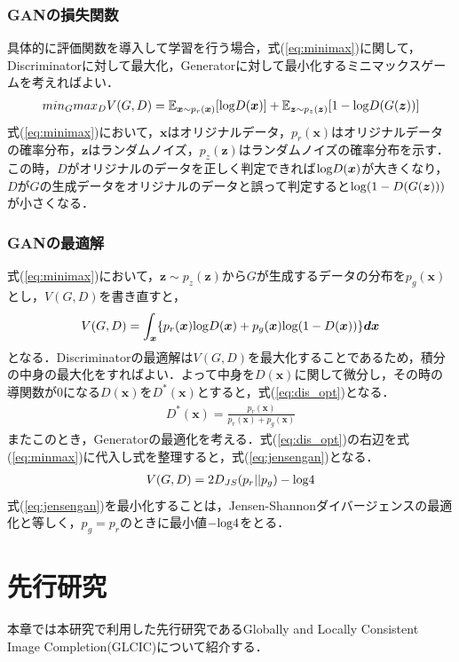 \documentclass[a4j, 11pt]{jreport}
\newcommand{\eref}[1]{式(\ref{#1})}
\begin{document}
\newpage
\subsection{GANの損失関数}
具体的に評価関数を導入して学習を行う場合，\eref{eq:minimax}に関して，Discriminatorに対して最大化，Generatorに対して最小化するミニマックスゲームを考えればよい\cite{GAN}．
\begin{eqnarray}
	min_G max_DV(G, D) = \mathbb E_{\bm x \sim p_r(\bm x)}[{\rm log}D(\bm x)] + \mathbb E_{\bm z \sim p_z(\bm z)}[1 - {\rm log}D(G(\bm z))] \label{eq:minimax}
\end{eqnarray}
\eref{eq:minimax}において，$\bm x$はオリジナルデータ，$p_r(\bm x)$はオリジナルデータの確率分布，$\bm z$はランダムノイズ，$p_z(\bm z)$はランダムノイズの確率分布を示す．
この時，$D$がオリジナルのデータを正しく判定できれば${\rm log}D(\bm x)$が大きくなり，$D$が$G$の生成データをオリジナルのデータと誤って判定すると${\rm log}(1-D(G(\bm z)))$が小さくなる．

\subsection{GANの最適解}
\eref{eq:minimax}において，$\bm z \sim p_z(\bm z)$から$G$が生成するデータの分布を$p_g(\bm x)$とし，$V(G, D)$を書き直すと，
\begin{eqnarray}
	V(G, D) = \int_{\bm x} \{p_r(\bm x) {\rm log}D(\bm x) + p_g(\bm x) {\rm log}(1-D(\bm x)) \} \bm{dx}\label{eq:minmax}
\end{eqnarray}
となる．Discriminatorの最適解は$V(G, D)$を最大化することであるため，積分の中身の最大化をすればよい．よって中身を$D(\bm x)$に関して微分し，その時の導関数が0になる$D(\bm x)$を$D^*(\bm x)$とすると，\eref{eq:dis_opt}となる．
\begin{eqnarray}
	D^*(\bm x) = \frac{p_r(\bm x)}{p_r(\bm x) + p_g(\bm x)}\label{eq:dis_opt}
\end{eqnarray}
またこのとき，Generatorの最適化を考える．\eref{eq:dis_opt}の右辺を\eref{eq:minmax}に代入し式を整理すると，\eref{eq:jensengan}となる．
\begin{eqnarray}
	V(G, D) = 2D_{JS}(p_r||p_g)-\rm log4 \label{eq:jensengan}
\end{eqnarray}
\eref{eq:jensengan}を最小化することは，Jensen-Shannonダイバージェンスの最適化と等しく，$p_g = p_r$のときに最小値$- \rm log4$をとる．

\chapter{先行研究}
本章では本研究で利用した先行研究であるGlobally and Locally Consistent Image Completion(GLCIC)\cite{GLCIC}について紹介する．\\
\end{document}
